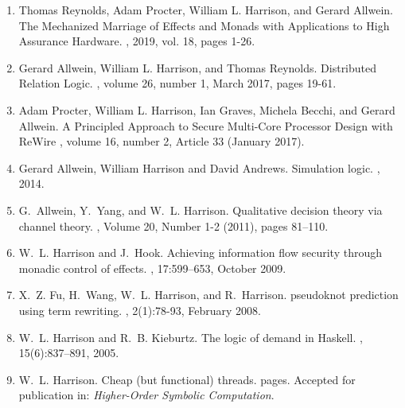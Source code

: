\documentclass[11pt]{article}
\begin{document}
\begin{enumerate}[leftmargin=0.0mm]


\item
Thomas Reynolds, Adam Procter, William L. Harrison, and Gerard Allwein.
\newblock The Mechanized Marriage of Effects and Monads with Applications to High Assurance Hardware.
, 2019, vol. 18, pages 1-26. 


\item
Gerard Allwein, William L. Harrison, and Thomas Reynolds.
\newblock Distributed Relation Logic.
, volume 26, number 1, March 2017, pages 19-61.


\item
Adam Procter, William L. Harrison, Ian Graves, Michela Becchi, and Gerard Allwein.
\newblock A Principled Approach to Secure Multi-Core Processor Design with ReWire
, volume 16, number 2, Article 33 (January 2017).


\item
Gerard Allwein, William Harrison and David Andrews.
\newblock Simulation logic.
, 2014.

\item
G.~Allwein, Y.~Yang, and W.~L. Harrison.
\newblock Qualitative decision theory via channel theory.
, Volume 20, Number 1-2 (2011), pages 81--110.

\item
W.~L. Harrison and J.~Hook.
\newblock Achieving information flow security through monadic control of
  effects.
, 17:599--653, October 2009.

\item
X.~Z. Fu, H.~Wang, W.~L. Harrison, and R.~Harrison.
 pseudoknot prediction using term rewriting.
, 2(1):78-93, February 2008.

\item
W.~L. Harrison and R.~B. Kieburtz.
\newblock The logic of demand in {H}askell.
, 15(6):837--891, 2005.


\item
W.~L. Harrison.
\newblock Cheap (but functional) threads.
 pages. Accepted for publication in: {\em Higher-Order Symbolic Computation}. 

\end{enumerate}
\end{document}
